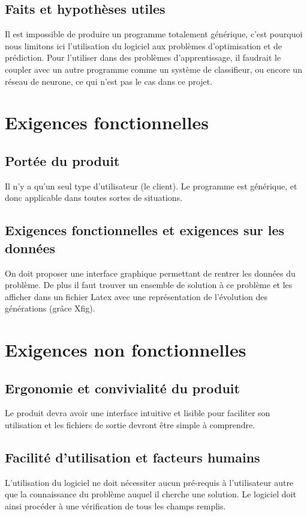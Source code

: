\documentclass[a4paper,11pt]{article}
\begin{document}
		\subsection{Faits et hypothèses utiles}
			Il est impossible de produire un programme totalement générique, c’est pourquoi nous limitons ici l’utilisation du logiciel aux problèmes d’optimisation et de prédiction. 
			Pour l’utiliser dans des problèmes d’apprentissage, il faudrait le coupler avec un autre programme comme un système de classifieur, ou encore un réseau de neurone, ce qui n’est pas le cas dans ce projet.
	\section{Exigences fonctionnelles}
		\subsection{Portée du produit}
			Il n’y a qu’un seul type d’utilisateur (le client). Le programme est générique, et donc applicable dans toutes sortes de situations.
		\subsection{Exigences fonctionnelles et exigences sur les données}
			On doit proposer une interface graphique permettant de rentrer les données du problème. De plus il faut trouver un ensemble de solution à ce problème et les afficher dans un fichier Latex avec une représentation de l’évolution des générations (grâce Xfig). 
			
	\section{Exigences non fonctionnelles}
		\subsection{Ergonomie et convivialité du produit}
			Le produit devra avoir une interface intuitive et lisible pour faciliter son utilisation et les fichiers de sortie devront être simple à comprendre.
		
		\subsection{Facilité d’utilisation et facteurs humains}
			L’utilisation du logiciel ne doit nécessiter aucun pré-requis à l’utilisateur autre que la connaissance du problème auquel il cherche une solution. 
			Le logiciel doit ainsi procéder à une vérification de tous les champs remplis.
		
\end{document}
